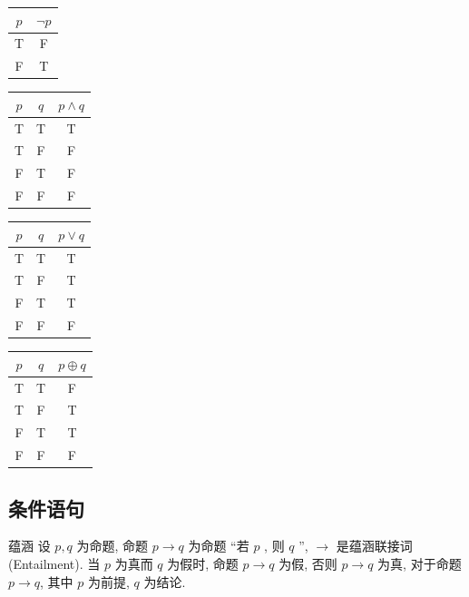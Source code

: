 \documentclass[cn,toc=twocol]{elegantbook}
\begin{document}
\begin{minipage}[c]{0.25\textwidth}
	\centering
	\begin{tabular}{c|c}
	$p$ & $\neg p$ \\
	\hline
	T & F \\
	F & T \\
	\end{tabular}
\end{minipage}
\begin{minipage}[c]{0.25\textwidth}
	\centering
	\begin{tabular}{cc|c}
	$p$ & $q$ & $p\land q$ \\
	\hline
	T & T & T \\
	T & F & F \\
	F & T & F \\
	F & F & F \\
	\end{tabular}
\end{minipage}
\begin{minipage}[c]{0.25\textwidth}
	\centering
	\begin{tabular}{cc|c}
	$p$ & $q$ & $p\lor q$ \\
	\hline
	T & T & T \\
	T & F & T \\
	F & T & T \\
	F & F & F \\
	\end{tabular}
\end{minipage}
\begin{minipage}[c]{0.25\textwidth}
	\centering
	\begin{tabular}{cc|c}
	$p$ & $q$ & $p\oplus q$ \\
	\hline
	T & T & F \\
	T & F & T \\
	F & T & T \\
	F & F & F \\
	\end{tabular}
\end{minipage}


\subsection{条件语句}

\begin{definition}{蕴涵}
设 $p, q$ 为命题, 命题 $p \rightarrow q$ 为命题 “若 $p$ , 则 $q$ ”, $\rightarrow$ 是蕴涵联接词 (Entailment). 当 $p$ 为真而 $q$ 为假时, 命题 $p \rightarrow q$ 为假, 否则 $p \rightarrow q$ 为真, 对于命题 $p \rightarrow q$, 其中 $p$ 为前提, $q$ 为结论.
\end{definition}
\end{document}

